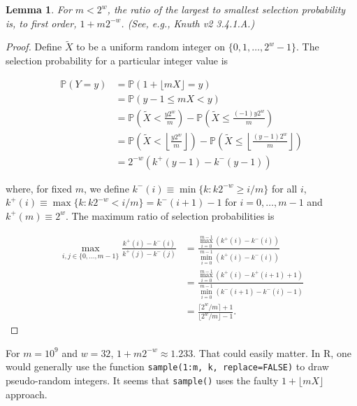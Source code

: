 \documentclass[12pt]{article}
\newtheorem{lemma}[theorem]{Lemma}
\newcommand{\todo}[1]{{\color{red}{TO DO: \sc #1}}}
\newcommand{\pr}{\mathbb{P}} %
\begin{document}
\begin{lemma}
For $m < 2^w$, the ratio of the largest to smallest selection probability is, to first order,  $1+ m 2^{-w}$. (See, e.g., Knuth v2 3.4.1.A.)
\end{lemma}

\begin{proof}
Define $\tilde{X}$ to be a uniform random integer on $\{0, 1, \dots, 2^w - 1\}$.
The selection probability for a particular integer value is 

\begin{align*}
\pr\left(Y = y\right) &= \pr\left(1 + \lfloor mX \rfloor = y\right) \\
&= \pr\left(y-1 \leq mX < y\right) \\
&= \pr\left(\tilde{X} < \frac{y2^w}{m}\right) - \pr\left(\tilde{X} \leq \frac{(-1)y2^w}{m}\right)\\
&= \pr\left(\tilde{X} < \left\lfloor\frac{y2^w}{m}\right\rfloor\right) - \pr\left(\tilde{X} \leq \left\lfloor\frac{(y-1)2^w}{m}\right\rfloor\right)\\
&= 2^{-w}\left(k^+(y-1)- k^-(y-1)\right)
\end{align*}

\noindent where, for fixed $m$, we define $k^-(i) \equiv \min \{k: k2^{-w} \geq i/m\}$ for all $i$,
$k^+(i) \equiv \max \{k : k2^{-w} < i/m \} = k^-(i+1)-1$ for $i = 0, \dots, m-1$
and $k^+(m) \equiv 2^w$.
The maximum ratio of selection probabilities is 

\begin{align*}
\max_{i, j \in \{0, \ldots, m-1\}} \frac{k^+(i) - k^-(i)}{k^+(j) - k^-(j)}
&= \frac{ \max_{i=0}^{m-1} (k^+(i) - k^-(i))}{\min_{i=0}^{m-1} (k^+(i) - k^-(i))} \\
&= \frac{ \max_{i=0}^{m-1} (k^+(i) - k^+(i+1) + 1)}{\min_{i=0}^{m-1} (k^-(i+1) - k^-(i) - 1)} \\
&= \frac{\lceil 2^w/m \rceil + 1}{\lfloor 2^w/m \rfloor -1}.
\end{align*}
\end{proof}
\todo{is this proof right? seems wrong}

For $m = 10^9$ and $w=32$, $1 + m 2^{-w} \approx 1.233$. That could easily matter.
In R, one would generally use the function \texttt{sample(1:m, k, replace=FALSE)} to draw pseudo-random integers. 
It seems that \texttt{sample()} uses the faulty $1 + \lfloor mX\rfloor$ approach.
\todo{illustrate with a figure}
\end{document}
